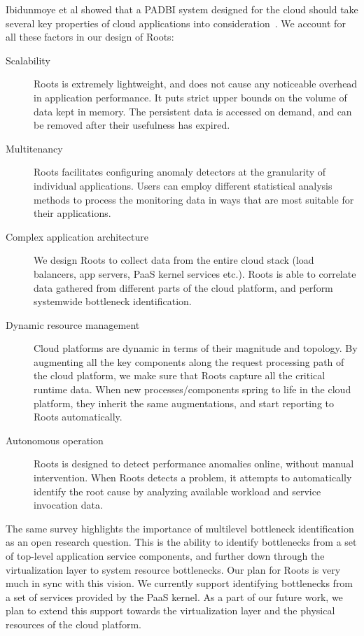 Ibidunmoye et al showed that a PADBI system designed for the cloud should take several key 
properties of cloud applications into consideration~\cite{Ibidunmoye:2015:PAD:2808687.2791120}. 
We account for all these factors in our design of Roots:
\begin{description}
\item[Scalability] Roots is extremely lightweight, and does not cause any noticeable overhead in 
application performance. It puts strict upper  bounds on the volume of data kept in memory. 
The persistent data is accessed on demand, and can be removed after their usefulness has expired.
\item[Multitenancy] Roots facilitates configuring anomaly detectors at the granularity of individual applications.
Users can employ different statistical analysis methods to process the monitoring data in ways that are 
most suitable for their applications.
\item[Complex application architecture] We design Roots to collect data from the entire cloud stack 
(load balancers, app servers, PaaS kernel services etc.). Roots is able to correlate data gathered
from different parts of the cloud platform, and perform systemwide bottleneck identification.
\item[Dynamic resource management] Cloud platforms are dynamic in terms of their magnitude 
and topology. By augmenting all the key components along the request processing path of the cloud platform,
we make sure that Roots capture all the critical runtime data. When new processes/components
spring to life in the cloud platform, they inherit the same augmentations, and start reporting to Roots automatically.
\item[Autonomous operation] Roots is designed to detect performance anomalies online, without manual intervention.
When Roots detects a problem, it attempts to automatically identify the root cause by analyzing
available workload and service invocation data. 
\end{description}
The same survey highlights the importance of multilevel bottleneck identification as an open research
question. This is the ability to
identify bottlenecks from a set of top-level application service components, and further down through the 
virtualization layer to system resource bottlenecks. Our plan for Roots is very much in sync with this
vision. We currently support identifying bottlenecks from a set of services provided by the PaaS kernel.
As a part of our future work, we plan to extend this support towards the virtualization layer and the
physical resources of the cloud platform.

